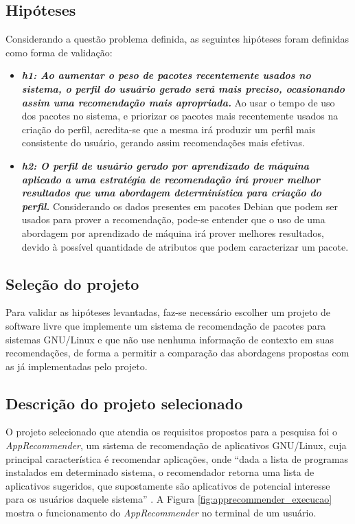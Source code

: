   \subsection{Hipóteses} \label{sec:hipoteses}

  Considerando a questão problema definida, as seguintes hipóteses foram definidas
  como forma de validação:

  \begin{itemize} \item \textit{\textbf{h1: Ao aumentar o peso de pacotes
  recentemente usados no sistema, o perfil do usuário gerado será mais preciso,
  ocasionando assim uma recomendação mais apropriada.}} Ao usar o tempo de uso dos
  pacotes no sistema, e priorizar os pacotes mais recentemente usados na criação
  do perfil, acredita-se que a mesma irá produzir um perfil mais
  consistente do usuário, gerando assim recomendações mais efetivas.\item
  \textit{\textbf{h2: O perfil de usuário gerado por aprendizado de máquina aplicado a uma
  estratégia de recomendação irá prover melhor resultados que uma abordagem
  determinística para criação do perfil.}}
  Considerando os dados presentes em pacotes Debian que podem ser
  usados para prover a recomendação, pode-se entender que o uso de uma abordagem
  por aprendizado de máquina irá prover melhores resultados, devido à possível
  quantidade de atributos que podem caracterizar um pacote.
  \end{itemize}

  \subsection{Seleção do projeto}

  Para validar as hipóteses levantadas, faz-se necessário escolher um projeto de
  software livre que implemente um sistema de recomendação de pacotes
  para sistemas GNU/Linux e que não use nenhuma informação de contexto em suas
  recomendações, de forma a permitir a comparação das abordagens propostas com as
  já implementadas pelo projeto.

  \subsection{Descrição do projeto selecionado}

  O projeto selecionado que atendia os requisitos propostos para a pesquisa foi o
  \textit{AppRecommender}, um sistema de recomendação de aplicativos GNU/Linux,
  cuja principal característica é recomendar aplicações,
  onde “dada a lista de programas instalados em determinado sistema, o recomendador retorna uma lista de aplicativos
  sugeridos, que supostamente são aplicativos de potencial interesse para os usuários daquele sistema”
  \cite{araujo2011apprecommender}. A Figura \ref{fig:apprecommender_execucao}
  mostra o funcionamento do \textit{AppRecommender} no terminal de um usuário.

